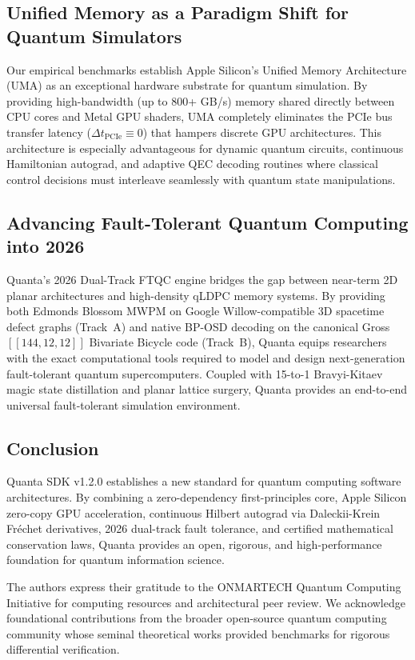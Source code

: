 \documentclass[aps,prx,twocolumn,superscriptaddress,nofootinbib]{revtex4-2}
\begin{document}
\subsection{Unified Memory as a Paradigm Shift for Quantum Simulators}
Our empirical benchmarks establish Apple Silicon's Unified Memory Architecture (UMA) as an exceptional hardware substrate for quantum simulation. By providing high-bandwidth (up to 800+ GB/s) memory shared directly between CPU cores and Metal GPU shaders, UMA completely eliminates the PCIe bus transfer latency ($\Delta t_{\text{PCIe}} \equiv 0$) that hampers discrete GPU architectures. This architecture is especially advantageous for dynamic quantum circuits, continuous Hamiltonian autograd, and adaptive QEC decoding routines where classical control decisions must interleave seamlessly with quantum state manipulations.

\subsection{Advancing Fault-Tolerant Quantum Computing into 2026}
Quanta's 2026 Dual-Track FTQC engine bridges the gap between near-term 2D planar architectures and high-density qLDPC memory systems. By providing both Edmonds Blossom MWPM on Google Willow-compatible 3D spacetime defect graphs (Track~A) and native BP-OSD decoding on the canonical Gross $[[144, 12, 12]]$ Bivariate Bicycle code (Track~B), Quanta equips researchers with the exact computational tools required to model and design next-generation fault-tolerant quantum supercomputers. Coupled with 15-to-1 Bravyi-Kitaev magic state distillation and planar lattice surgery, Quanta provides an end-to-end universal fault-tolerant simulation environment.

\subsection{Conclusion}
Quanta SDK v1.2.0 establishes a new standard for quantum computing software architectures. By combining a zero-dependency first-principles core, Apple Silicon zero-copy GPU acceleration, continuous Hilbert autograd via Daleckii-Krein Fr\'echet derivatives, 2026 dual-track fault tolerance, and certified mathematical conservation laws, Quanta provides an open, rigorous, and high-performance foundation for quantum information science.

\begin{acknowledgments}
The authors express their gratitude to the ONMARTECH Quantum Computing Initiative for computing resources and architectural peer review. We acknowledge foundational contributions from the broader open-source quantum computing community whose seminal theoretical works provided benchmarks for rigorous differential verification.
\end{acknowledgments}


\end{document}
